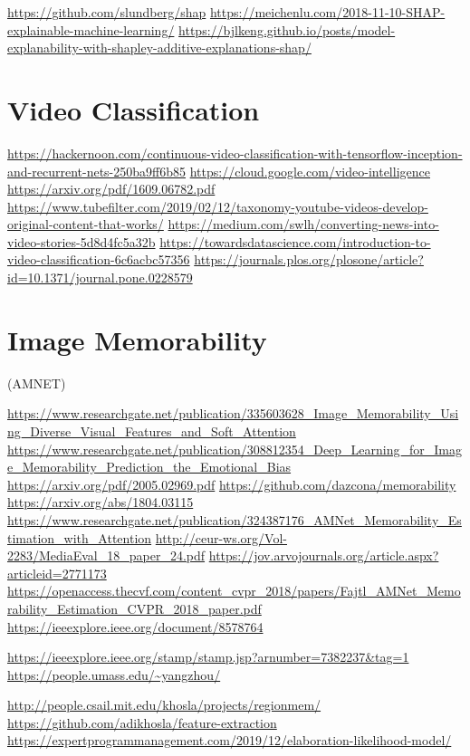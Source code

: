 \documentclass[
]{book}
\begin{document}
\url{https://github.com/slundberg/shap}
\url{https://meichenlu.com/2018-11-10-SHAP-explainable-machine-learning/}
\url{https://bjlkeng.github.io/posts/model-explanability-with-shapley-additive-explanations-shap/}

\hypertarget{video-classification-1}{%
\section{Video Classification}\label{video-classification-1}}

\url{https://hackernoon.com/continuous-video-classification-with-tensorflow-inception-and-recurrent-nets-250ba9ff6b85}
\url{https://cloud.google.com/video-intelligence}
\url{https://arxiv.org/pdf/1609.06782.pdf}
\url{https://www.tubefilter.com/2019/02/12/taxonomy-youtube-videos-develop-original-content-that-works/}
\url{https://medium.com/swlh/converting-news-into-video-stories-5d8d4fc5a32b}
\url{https://towardsdatascience.com/introduction-to-video-classification-6c6acbc57356}
\url{https://journals.plos.org/plosone/article?id=10.1371/journal.pone.0228579}

\hypertarget{image-memorability-1}{%
\section{Image Memorability}\label{image-memorability-1}}

(AMNET)

\url{https://www.researchgate.net/publication/335603628_Image_Memorability_Using_Diverse_Visual_Features_and_Soft_Attention}
\url{https://www.researchgate.net/publication/308812354_Deep_Learning_for_Image_Memorability_Prediction_the_Emotional_Bias}
\url{https://arxiv.org/pdf/2005.02969.pdf}
\url{https://github.com/dazcona/memorability}
\url{https://arxiv.org/abs/1804.03115}
\url{https://www.researchgate.net/publication/324387176_AMNet_Memorability_Estimation_with_Attention}
\url{http://ceur-ws.org/Vol-2283/MediaEval_18_paper_24.pdf}
\url{https://jov.arvojournals.org/article.aspx?articleid=2771173}
\url{https://openaccess.thecvf.com/content_cvpr_2018/papers/Fajtl_AMNet_Memorability_Estimation_CVPR_2018_paper.pdf}
\url{https://ieeexplore.ieee.org/document/8578764}

\url{https://ieeexplore.ieee.org/stamp/stamp.jsp?arnumber=7382237\&tag=1}
\url{https://people.umass.edu/~yangzhou/}

\url{http://people.csail.mit.edu/khosla/projects/regionmem/}
\url{https://github.com/adikhosla/feature-extraction}
\url{https://expertprogrammanagement.com/2019/12/elaboration-likelihood-model/}
\end{document}

